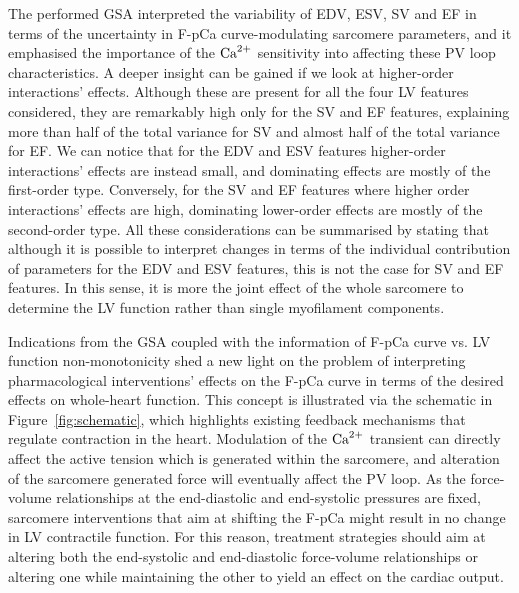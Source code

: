 \vspace{0.2cm}
The performed GSA interpreted the variability of EDV, ESV, SV and EF in terms of the uncertainty in F-pCa curve-modulating sarcomere parameters, and it emphasised the importance of the $\textrm{Ca}^{2+}$ sensitivity into affecting these PV loop characteristics. A deeper insight can be gained if we look at higher-order interactions' effects. Although these are present for all the four LV features considered, they are remarkably high only for the SV and EF features, explaining more than half of the total variance for SV and almost half of the total variance for EF. We can notice that for the EDV and ESV features higher-order interactions' effects are instead small, and dominating effects are mostly of the first-order type. Conversely, for the SV and EF features where higher order interactions' effects are high, dominating lower-order effects are mostly of the second-order type. All these considerations can be summarised by stating that although it is possible to interpret changes in terms of the individual contribution of parameters for the EDV and ESV features, this is not the case for SV and EF features. In this sense, it is more the joint effect of the whole sarcomere to determine the LV function rather than single myofilament components.

\vspace{0.2cm}
Indications from the GSA coupled with the information of F-pCa curve vs. LV function non-monotonicity shed a new light on the problem of interpreting pharmacological interventions' effects on the F-pCa curve in terms of the desired effects on whole-heart function. This concept is illustrated via the schematic in Figure~\ref{fig:schematic}, which highlights existing feedback mechanisms that regulate contraction in the heart. Modulation of the $\textrm{Ca}^{2+}$ transient can directly affect the active tension which is generated within the sarcomere, and alteration of the sarcomere generated force will eventually affect the PV loop. As the force-volume relationships at the end-diastolic and end-systolic pressures are fixed, sarcomere interventions that aim at shifting the F-pCa might result in no change in LV contractile function. For this reason, treatment strategies should aim at altering both the end-systolic and end-diastolic force-volume relationships or altering one while maintaining the other to yield an effect on the cardiac output.

